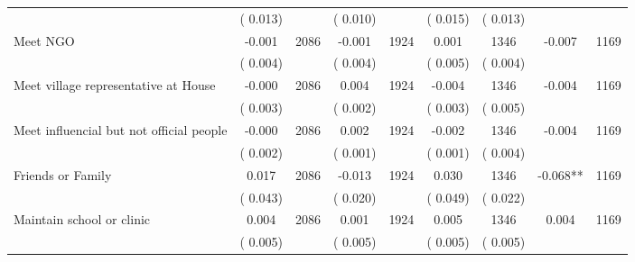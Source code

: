 \begin{tabular}{l*{8}{c}}
                       &       (       0.013)            &                               &       (       0.010)            &                               &       (       0.015)            &       (       0.013) &                  \\
Meet NGO        &             -0.001      &       2086       &             -0.001      &       1924       &              0.001      &       1346  &       -0.007 &       1169       \\
                       &       (       0.004)            &                               &       (       0.004)            &                               &       (       0.005)            &       (       0.004) &                  \\
Meet village representative at House        &             -0.000      &       2086       &              0.004      &       1924       &             -0.004      &       1346  &       -0.004 &       1169       \\
                       &       (       0.003)            &                               &       (       0.002)            &                               &       (       0.003)            &       (       0.005) &                  \\
Meet influencial but not official people        &             -0.000      &       2086       &              0.002      &       1924       &             -0.002      &       1346  &       -0.004 &       1169       \\
                       &       (       0.002)            &                               &       (       0.001)            &                               &       (       0.001)            &       (       0.004) &                  \\
Friends or Family        &              0.017      &       2086       &             -0.013      &       1924       &              0.030      &       1346  &       -0.068** &       1169       \\
                       &       (       0.043)            &                               &       (       0.020)            &                               &       (       0.049)            &       (       0.022) &                  \\
Maintain school or clinic        &              0.004      &       2086       &              0.001      &       1924       &              0.005      &       1346  &        0.004 &       1169       \\
                       &       (       0.005)            &                               &       (       0.005)            &                               &       (       0.005)            &       (       0.005) &                  \\

\end{tabular}
